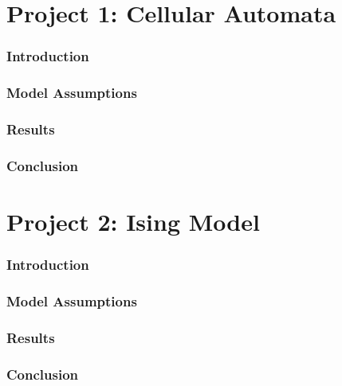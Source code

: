 \documentclass[12pt,letterpaper,cm]{article}
\renewcommand{\.}{\cdot}
\newcommand{\<}{\langle}
\renewcommand{\>}{\rangle}
\begin{document}
	
	\part*{Project 1: Cellular Automata}
	
	
	\section*{Introduction}
	
	
	
	\section*{Model Assumptions}
	
	
	
	\section*{Results}	
	
	
	
	\section*{Conclusion}
	
	
	
	\newpage
	
	
	
	\part*{Project 2: Ising Model}
	
	
	\section*{Introduction}
	
	
	
	\section*{Model Assumptions}
	
	
	
	\section*{Results}	
	
	
	
	\section*{Conclusion}
	
\end{document}
